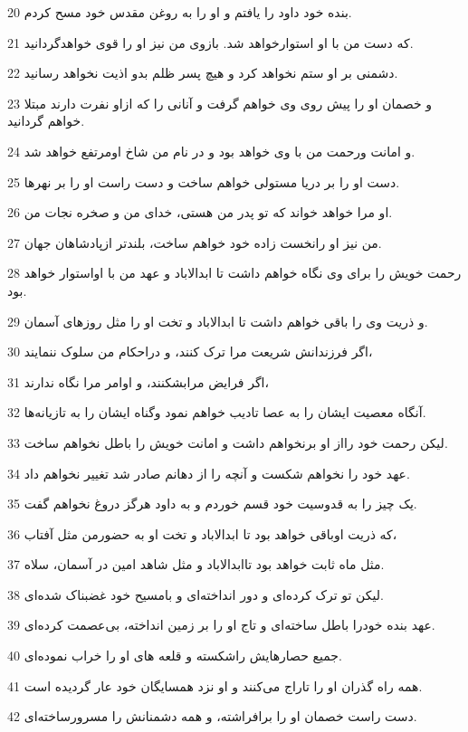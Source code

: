 \par 20 بنده خود داود را یافتم و او را به روغن مقدس خود مسح کردم.
\par 21 که دست من با او استوارخواهد شد. بازوی من نیز او را قوی خواهدگردانید.
\par 22 دشمنی بر او ستم نخواهد کرد و هیچ پسر ظلم بدو اذیت نخواهد رسانید.
\par 23 و خصمان او را پیش روی وی خواهم گرفت و آنانی را که ازاو نفرت دارند مبتلا خواهم گردانید.
\par 24 و امانت ورحمت من با وی خواهد بود و در نام من شاخ اومرتفع خواهد شد.
\par 25 دست او را بر دریا مستولی خواهم ساخت و دست راست او را بر نهرها.
\par 26 او مرا خواهد خواند که تو پدر من هستی، خدای من و صخره نجات من.
\par 27 من نیز او رانخست زاده خود خواهم ساخت، بلندتر ازپادشاهان جهان.
\par 28 رحمت خویش را برای وی نگاه خواهم داشت تا ابدالاباد و عهد من با اواستوار خواهد بود.
\par 29 و ذریت وی را باقی خواهم داشت تا ابدالاباد و تخت او را مثل روزهای آسمان.
\par 30 اگر فرزندانش شریعت مرا ترک کنند، و دراحکام من سلوک ننمایند،
\par 31 اگر فرایض مرابشکنند، و اوامر مرا نگاه ندارند، 
\par 32 آنگاه معصیت ایشان را به عصا تادیب خواهم نمود وگناه ایشان را به تازیانه‌ها.
\par 33 لیکن رحمت خود رااز او برنخواهم داشت و امانت خویش را باطل نخواهم ساخت.
\par 34 عهد خود را نخواهم شکست و آنچه را از دهانم صادر شد تغییر نخواهم داد.
\par 35 یک چیز را به قدوسیت خود قسم خوردم و به داود هرگز دروغ نخواهم گفت.
\par 36 که ذریت اوباقی خواهد بود تا ابدالاباد و تخت او به حضورمن مثل آفتاب،
\par 37 مثل ماه ثابت خواهد بود تاابدالاباد و مثل شاهد امین در آسمان، سلاه.
\par 38 لیکن تو ترک کرده‌ای و دور انداخته‌ای و بامسیح خود غضبناک شده‌ای.
\par 39 عهد بنده خودرا باطل ساخته‌ای و تاج او را بر زمین انداخته، بی‌عصمت کرده‌ای.
\par 40 جمیع حصارهایش راشکسته و قلعه های او را خراب نموده‌ای.
\par 41 همه راه گذران او را تاراج می‌کنند و او نزد همسایگان خود عار گردیده است.
\par 42 دست راست خصمان او را برافراشته، و همه دشمنانش را مسرورساخته‌ای.
